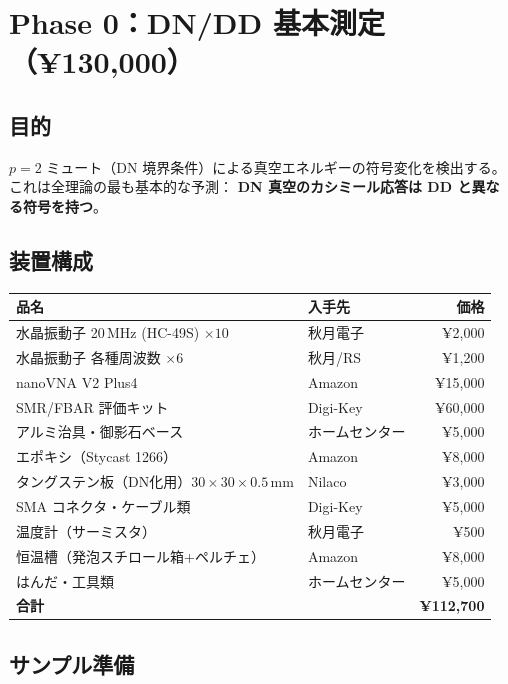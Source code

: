 \documentclass[11pt,a4paper]{article}
\begin{document}
\section{Phase 0：DN/DD 基本測定（¥130,000）}

\subsection{目的}

$p = 2$ ミュート（DN 境界条件）による真空エネルギーの符号変化を検出する。
これは全理論の最も基本的な予測：
\textbf{DN 真空のカシミール応答は DD と異なる符号を持つ}。

\subsection{装置構成}

\begin{tcolorbox}[colback=blue!5,colframe=blue!50!black,title=装置リスト]
\begin{tabular}{llr}
\toprule
品名 & 入手先 & 価格 \\
\midrule
水晶振動子 20\,MHz (HC-49S) $\times 10$ & 秋月電子 & ¥2,000 \\
水晶振動子 各種周波数 $\times 6$ & 秋月/RS & ¥1,200 \\
nanoVNA V2 Plus4 & Amazon & ¥15,000 \\
SMR/FBAR 評価キット & Digi-Key & ¥60,000 \\
アルミ治具・御影石ベース & ホームセンター & ¥5,000 \\
エポキシ（Stycast 1266） & Amazon & ¥8,000 \\
タングステン板（DN化用）$30\times30\times0.5$\,mm & Nilaco & ¥3,000 \\
SMA コネクタ・ケーブル類 & Digi-Key & ¥5,000 \\
温度計（サーミスタ） & 秋月電子 & ¥500 \\
恒温槽（発泡スチロール箱+ペルチェ） & Amazon & ¥8,000 \\
はんだ・工具類 & ホームセンター & ¥5,000 \\
\midrule
\textbf{合計} & & \textbf{¥112,700} \\
\bottomrule
\end{tabular}
\end{tcolorbox}

\subsection{サンプル準備}
\end{document}

